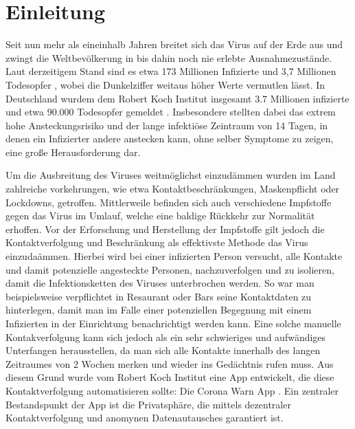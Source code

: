 \documentclass[conference]{IEEEtran}
\begin{document}
\section{Einleitung}
Seit nun mehr als eineinhalb Jahren breitet sich das Virus auf der Erde aus und zwingt die Weltbevölkerung in bis dahin noch nie erlebte Ausnahmezustände.
Laut derzeitigem Stand sind es etwa 173 Millionen Infizierte und 3,7 Millionen Todesopfer \cite{CoronaZahlenWorld}, wobei die Dunkelziffer weitaus höher Werte vermutlen lässt. 
In Deutschland wurdem dem Robert Koch Institut insgesamt 3.7 Millionen infizierte und etwa 90.000 Todesopfer gemeldet \cite{CoronaZahlenDe}. 
Insbesondere stellten dabei das extrem hohe Ansteckungsrisiko und der lange infektiöse Zeintraum von 14 Tagen, in denen ein Infizierter andere anstecken kann, ohne selber Symptome zu zeigen, eine große Herausforderung dar.

Um die Ausbreitung des Viruses weitmöglichst einzudämmen wurden im Land zahlreiche vorkehrungen, wie etwa Kontaktbeschränkungen, Maskenpflicht oder Lockdowns, getroffen. 
Mittlerweile befinden sich auch verschiedene Impfstoffe gegen das Virus im Umlauf, welche eine baldige Rückkehr zur Normalität erhoffen.
Vor der Erforschung und Herstellung der Impfstoffe gilt jedoch die Kontaktverfolgung und Beschränkung als effektivste Methode das Virus einzudaämmen. 
Hierbei wird bei einer infizierten Person versucht, alle Kontakte und damit potenzielle angesteckte Personen, nachzuverfolgen und zu isolieren, damit die Infektionsketten des Viruses unterbrochen werden.
So war man beispielsweise verpflichtet in Resaurant oder Bars seine Kontaktdaten zu hinterlegen, damit man im Falle einer potenziellen Begegnung mit einem Infizierten in der Einrichtung benachrichtigt werden kann.
Eine solche manuelle Kontakverfolgung kann sich jedoch als ein sehr schwieriges und aufwändiges Unterfangen herausstellen, da man sich alle Kontakte innerhalb des langen Zeitraumes von 2 Wochen merken und wieder ins Gedächtnis rufen muss.
Aus diesem Grund wurde vom Robert Koch Institut eine App entwickelt, die diese Kontaktverfolgung automatisieren sollte: Die Corona Warn App \cite{}. Ein zentraler Bestandspunkt der App ist die Privatsphäre, die mittels dezentraler Kontaktverfolgung und anomynen Datenautausches garantiert ist.
\end{document}
